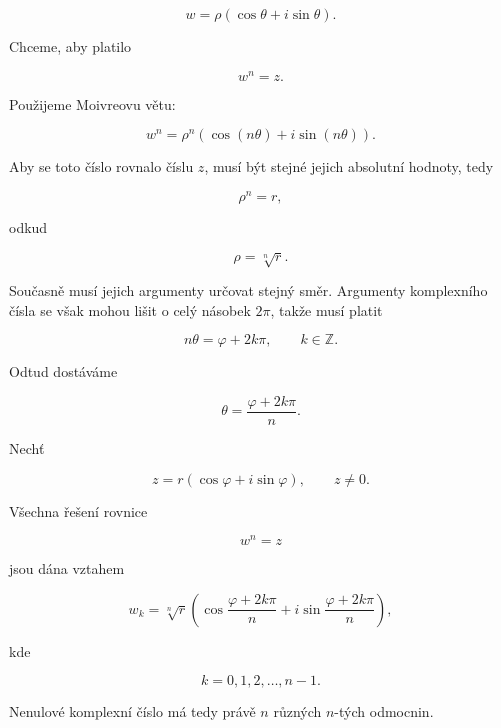\documentclass[12pt,a4paper]{article}
\begin{document}
\[
    w
    =
    \rho
    \left(
        \cos\theta
        +
        i\sin\theta
    \right).
\]

Chceme, aby platilo

\[
    w^n=z.
\]

Použijeme Moivreovu větu:

\[
    w^n
    =
    \rho^n
    \left(
        \cos(n\theta)
        +
        i\sin(n\theta)
    \right).
\]

Aby se toto číslo rovnalo číslu $z$, musí být stejné jejich absolutní hodnoty,
tedy

\[
    \rho^n=r,
\]

odkud

\[
    \rho=\sqrt[n]{r}.
\]

Současně musí jejich argumenty určovat stejný směr. Argumenty komplexního čísla
se však mohou lišit o celý násobek $2\pi$, takže musí platit

\[
    n\theta
    =
    \varphi+2k\pi,
    \qquad
    k\in\mathbb{Z}.
\]

Odtud dostáváme

\[
    \theta
    =
    \frac{\varphi+2k\pi}{n}.
\]

\begin{definitionbox}

Nechť

\[
    z
    =
    r
    \left(
        \cos\varphi+i\sin\varphi
    \right),
    \qquad
    z\neq0.
\]

Všechna řešení rovnice

\[
    w^n=z
\]

jsou dána vztahem

\[
    w_k
    =
    \sqrt[n]{r}
    \left(
        \cos\frac{\varphi+2k\pi}{n}
        +
        i\sin\frac{\varphi+2k\pi}{n}
    \right),
\]

kde

\[
    k=0,1,2,\ldots,n-1.
\]

Nenulové komplexní číslo má tedy právě $n$ různých $n$-tých odmocnin.

\end{definitionbox}
\end{document}
